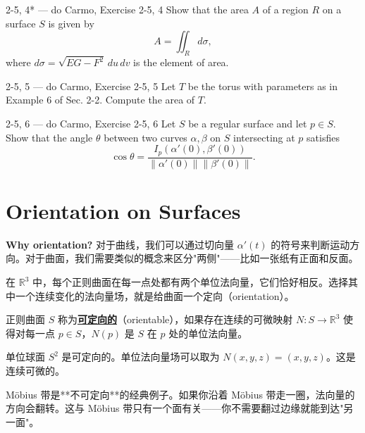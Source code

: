 \begin{exercise}{2-5, 4* — do Carmo, Exercise 2-5, 4}
Show that the area $A$ of a region $R$ on a surface $S$ is given by
\[
A = \iint_R d\sigma,
\]
where $d\sigma = \sqrt{EG - F^2}\, du\, dv$ is the element of area.
\end{exercise}

\begin{exercise}{2-5, 5 — do Carmo, Exercise 2-5, 5}
Let $T$ be the torus with parameters as in Example 6 of Sec. 2-2. Compute the area of $T$.
\end{exercise}

\begin{exercise}{2-5, 6 — do Carmo, Exercise 2-5, 6}
Let $S$ be a regular surface and let $p \in S$. Show that the angle $\theta$ between two curves $\alpha, \beta$ on $S$ intersecting at $p$ satisfies
\[
\cos\theta = \frac{I_p(\alpha'(0), \beta'(0))}{\|\alpha'(0)\| \|\beta'(0)\|}.
\]
\end{exercise}

\section{Orientation on Surfaces}\label{sec:orientation}

\textbf{Why orientation?} 对于曲线，我们可以通过切向量 $\alpha'(t)$ 的符号来判断运动方向。对于曲面，我们需要类似的概念来区分"两侧"——比如一张纸有正面和反面。

在 $\mathbb{R}^3$ 中，每个正则曲面在每一点处都有两个单位法向量，它们恰好相反。选择其中一个连续变化的法向量场，就是给曲面一个定向（orientation）。

\begin{Definition}[可定向曲面]\label{def:orientable}
正则曲面 $S$ 称为\textbf{\underline{可定向的}}（orientable），如果存在连续的可微映射 $N: S \to \mathbb{R}^3$ 使得对每一点 $p \in S$，$N(p)$ 是 $S$ 在 $p$ 处的单位法向量。
\end{Definition}

\begin{Example}[球面是可定向的]\label{ex:sphere-orientable}
单位球面 $S^2$ 是可定向的。单位法向量场可以取为 $N(x,y,z) = (x,y,z)$。这是连续可微的。
\end{Example}

\begin{Example}\label{ex:mobius-not-orientable}
Möbius 带是**不可定向**的经典例子。如果你沿着 Möbius 带走一圈，法向量的方向会翻转。这与 Möbius 带只有一个面有关——你不需要翻过边缘就能到达"另一面"。
\end{Example}

